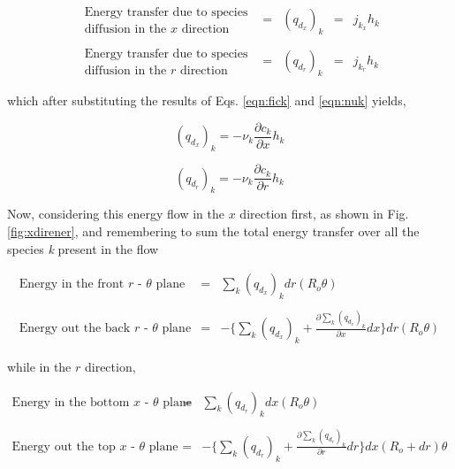 \begin{displaymath}
	\begin{array}{ccccc}
		\begin{array}{c}
			\textrm{Energy transfer due to species}\\ \textrm{diffusion in the $x$ direction}
		\end{array} 
		& = & (q_{d_x})_k & = & j_{k_x}h_k
		\\ & & & & \\
		\begin{array}{c}
			\textrm{Energy transfer due to species}\\ \textrm{diffusion in the $r$ direction} 
		\end{array}
		& = & (q_{d_r})_k & = & j_{k_r}h_k
	\end{array}
\end{displaymath} 

	which after substituting the results of Eqs. \ref{eqn:fick} and \ref{eqn:nuk} yields,

\begin{equation}
	(q_{d_x})_k = -\nu_k \frac{\partial c_k}{\partial x}h_k
\label{eqn:qdx}
\end{equation}

\begin{equation}
	(q_{d_r})_k = -\nu_k \frac{\partial c_k}{\partial r}h_k
\label{eqn:qdr}
\end{equation}

	Now, considering this energy flow in the $x$ direction first, as shown in Fig. \ref{fig:xdirener}, and
remembering to sum the total energy transfer over all the species \emph{k} present in the flow

\begin{displaymath}
	\begin{array}{ccc}
		\textrm{Energy in the front $r$ - $\theta$ plane} & = & \sum_k (q_{d_x})_kdr(R_o \theta) 
		\\ & & \\
		\textrm{Energy out the back $r$ - $\theta$ plane} & = & -\Big\{\sum_k (q_{d_x})_k + 
		\frac{\partial \sum_k (q_{d_x})_k}{\partial x}dx\Big\}dr(R_o \theta)
	\end{array}
\end{displaymath}

	while in the $r$ direction,

\begin{displaymath}
	\begin{array}{ccc}
		\textrm{Energy in the bottom $x$ - $\theta$ plane} & = & \sum_k (q_{d_r})_kdx(R_o \theta) 
		\\ & & \\
		\textrm{Energy out the top $x$ - $\theta$ plane} & = & -\Big\{\sum_k (q_{d_r})_k + 
		\frac{\partial \sum_k (q_{d_r})_k}{\partial r}dr\Big\}dx(R_o + dr) \theta
	\end{array}
\end{displaymath}

